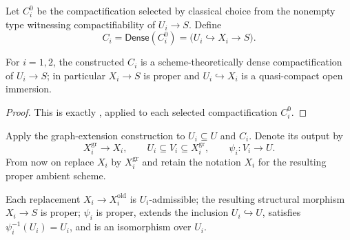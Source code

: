 \begin{definition}
  \label{def:nagata-two-open-dense-compactifications}

  Let $C_i^0$ be the compactification selected by classical choice from the
  nonempty type witnessing compactifiability of $U_i\to S$.  Define
  \[
    C_i=\mathsf{Dense}(C_i^0)
      =\bigl(U_i\hookrightarrow X_i\longrightarrow S\bigr).
  \]
\end{definition}

\begin{lemma}
  \label{lemma:nagata-two-open-dense-compactifications}

  For $i=1,2$, the constructed $C_i$ is a scheme-theoretically dense
  compactification of $U_i\to S$; in particular $X_i\to S$ is proper and
  $U_i\hookrightarrow X_i$ is a quasi-compact open immersion.
\end{lemma}

\begin{proof}
  This is exactly , applied to each selected
  compactification $C_i^0$.
\end{proof}

\begin{definition}
  \label{def:nagata-two-open-graph-extensions}

  Apply the graph-extension construction to
  $U_i\subseteq U$ and $C_i$.  Denote its output by
  \[
    X_i^{\mathrm{gr}}\longrightarrow X_i,\qquad
    U_i\subseteq V_i\subseteq X_i^{\mathrm{gr}},\qquad
    \psi_i\colon V_i\longrightarrow U.
  \]
  From now on replace $X_i$ by $X_i^{\mathrm{gr}}$ and retain the notation
  $X_i$ for the resulting proper ambient scheme.
\end{definition}

\begin{lemma}
  \label{lemma:nagata-two-open-graph-extensions}

  Each replacement $X_i\to X_i^{\mathrm{old}}$ is $U_i$-admissible;
  the resulting structural morphism $X_i\to S$ is proper;
  $\psi_i$ is proper, extends the inclusion $U_i\hookrightarrow U$, satisfies
  $\psi_i^{-1}(U_i)=U_i$, and is an isomorphism over $U_i$.
\end{lemma}


